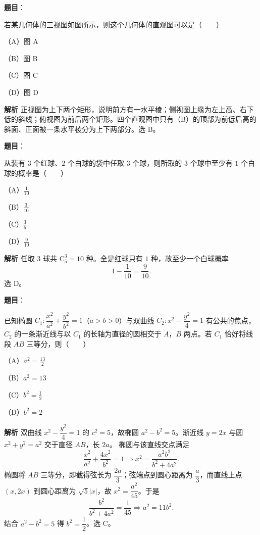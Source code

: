 \begin{answer}

\textbf{题目}：

若某几何体的三视图如图所示，则这个几何体的直观图可以是\mbox{（　　）}

（A）图 A

（B）图 B

（C）图 C

（D）图 D
\nopagebreak[4]
\begin{center}\end{center}
\nopagebreak[4]
\textbf{解析}
正视图为上下两个矩形，说明前方有一水平棱；侧视图上缘为左上高、右下低的斜线；俯视图为前后两个矩形。四个直观图中只有（B）的顶部为前低后高的斜面、正面被一条水平棱分为上下两部分。选 B。


\end{answer}
\begin{answer}

\textbf{题目}：

从装有 $3$ 个红球、$2$ 个白球的袋中任取 $3$ 个球，则所取的 $3$ 个球中至少有 $1$ 个白球的概率是\mbox{（　　）}

（A）$\frac1{10}$

（B）$\frac3{10}$

（C）$\frac35$

（D）$\frac9{10}$

\textbf{解析}
任取 $3$ 球共 $\mathrm C_5^3=10$ 种。全是红球只有 $1$ 种，故至少一个白球概率
\nopagebreak[4]
\[1-\frac1{10}=\frac9{10}.\]
选 D。


\end{answer}
\begin{answer}

\textbf{题目}：

已知椭圆 $C_1:\dfrac{x^2}{a^2}+\dfrac{y^2}{b^2}=1$（$a>b>0$）与双曲线 $C_2:x^2-\dfrac{y^2}4=1$ 有公共的焦点，$C_2$ 的一条渐近线与以 $C_1$ 的长轴为直径的圆相交于 $A$，$B$ 两点。若 $C_1$ 恰好将线段 $AB$ 三等分，则\mbox{（　　）}

（A）$a^2=\frac{13}2$

（B）$a^2=13$

（C）$b^2=\frac12$

（D）$b^2=2$

\textbf{解析}
双曲线 $x^2-\dfrac{y^2}4=1$ 的 $c^2=5$，故椭圆 $a^2-b^2=5$。渐近线 $y=2x$ 与圆 $x^2+y^2=a^2$ 交于直径 $AB$，长 $2a$。
椭圆与该直线交点满足
\nopagebreak[4]
\[\frac{x^2}{a^2}+\frac{4x^2}{b^2}=1\Longrightarrow x^2=\frac{a^2b^2}{b^2+4a^2}.\]
椭圆将 $AB$ 三等分，即截得弦长为 $\dfrac{2a}3$；弦端点到圆心距离为 $\dfrac a3$，而直线上点 $(x,2x)$ 到圆心距离为 $\sqrt5|x|$，故 $x^2=\dfrac{a^2}{45}$。于是
\nopagebreak[4]
\[\frac{b^2}{b^2+4a^2}=\frac1{45}\Longrightarrow a^2=11b^2.\]
结合 $a^2-b^2=5$ 得 $b^2=\dfrac12$。选 C。


\end{answer}
